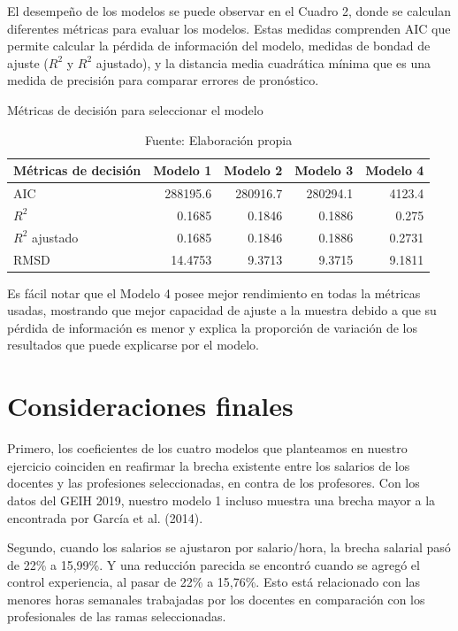 \documentclass[a4paper]{article}
\begin{document}
El desempeño de los modelos se puede observar en el Cuadro 2, donde se calculan diferentes métricas para evaluar los modelos. Estas medidas comprenden AIC que permite calcular la pérdida de información del modelo, medidas de bondad de ajuste ($R^2$ y $R^2$ ajustado), y la 	distancia media cuadrática mínima que es una medida de precisión para comparar errores de pronóstico.

\begin{table}[htbp]
	\centering
	\caption{Métricas de decisión para seleccionar el modelo}
	\begin{tabular}{|l|r|r|r|r|}
		\toprule
		\textbf{Métricas de decisión} & \multicolumn{1}{l|}{\textbf{Modelo 1}} & \multicolumn{1}{l|}{\textbf{Modelo 2}} & \multicolumn{1}{l|}{\textbf{Modelo 3}} & \multicolumn{1}{l|}{\textbf{Modelo 4}} \\
		\midrule
		AIC   & 288195.6 & 280916.7 & 280294.1 & 4123.4 \\
		$R^2$    & 0.1685 & 0.1846 & 0.1886 & 0.275 \\
		$R^2$ ajustado & 0.1685 & 0.1846 & 0.1886 & 0.2731 \\
		RMSD  & 14.4753 & 9.3713 & 9.3715 & 9.1811 \\
		\bottomrule
	\end{tabular}
	\caption*{Fuente: Elaboración propia}
	\label{tab:metricas}
\end{table} 

Es fácil notar que el Modelo 4 posee mejor rendimiento en todas la métricas usadas, mostrando que mejor capacidad de ajuste a la muestra debido a que su pérdida de información es menor y explica la proporción de variación de los resultados que puede explicarse por el modelo.

    \section{Consideraciones finales}
Primero, los coeficientes de los cuatro modelos que planteamos en nuestro ejercicio coinciden en reafirmar la brecha existente entre los salarios de los docentes y las profesiones seleccionadas, en contra de los profesores. Con los datos del GEIH 2019, nuestro modelo 1 incluso muestra una brecha mayor a la encontrada por García et al. (2014).

Segundo, cuando los salarios se ajustaron por salario/hora, la brecha salarial pasó de 22\% a 15,99\%. Y una reducción parecida se encontró cuando se agregó el control experiencia, al pasar de 22\% a 15,76\%. Esto está relacionado con las menores horas semanales trabajadas por los docentes en comparación con los profesionales de las ramas seleccionadas.
\end{document}
